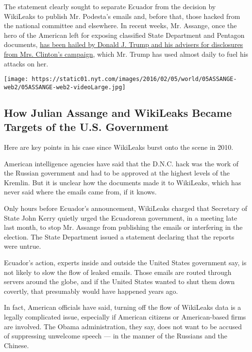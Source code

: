 The statement clearly sought to separate Ecuador from the decision by
WikiLeaks to publish Mr. Podesta's emails and, before that, those hacked
from the national committee and elsewhere. In recent weeks, Mr. Assange,
once the hero of the American left for exposing classified State
Department and Pentagon documents,
\href{http://www.nytimes.com/2016/10/13/us/politics/wikileaks-hillary-clinton-emails.html}{has
been hailed by Donald J. Trump and his advisers for disclosures from
Mrs. Clinton's campaign}, which Mr. Trump has used almost daily to fuel
his attacks on her.

\href{https://www.nytimes.com/interactive/2019/world/julian-assange-wikileaks.html}{}

\texttt{[image: https://static01.nyt.com/images/2016/02/05/world/05ASSANGE-web2/05ASSANGE-web2-videoLarge.jpg]}

\hypertarget{how-julian-assange-and-wikileaks-became-targets-of-the-us-government}{%
\subsection{How Julian Assange and WikiLeaks Became Targets of the U.S.
Government}\label{how-julian-assange-and-wikileaks-became-targets-of-the-us-government}}

Here are key points in his case since WikiLeaks burst onto the scene in
2010.

American intelligence agencies have said that the D.N.C. hack was the
work of the Russian government and had to be approved at the highest
levels of the Kremlin. But it is unclear how the documents made it to
WikiLeaks, which has never said where the emails came from, if it knows.

Only hours before Ecuador's announcement, WikiLeaks charged that
Secretary of State John Kerry quietly urged the Ecuadorean government,
in a meeting late last month, to stop Mr. Assange from publishing the
emails or interfering in the election. The State Department issued a
statement declaring that the reports were untrue.

Ecuador's action, experts inside and outside the United States
government say, is not likely to slow the flow of leaked emails. Those
emails are routed through servers around the globe, and if the United
States wanted to shut them down covertly, that presumably would have
happened years ago.

In fact, American officials have said, turning off the flow of WikiLeaks
data is a legally complicated issue, especially if American citizens or
American-based firms are involved. The Obama administration, they say,
does not want to be accused of suppressing unwelcome speech --- in the
manner of the Russians and the Chinese.

